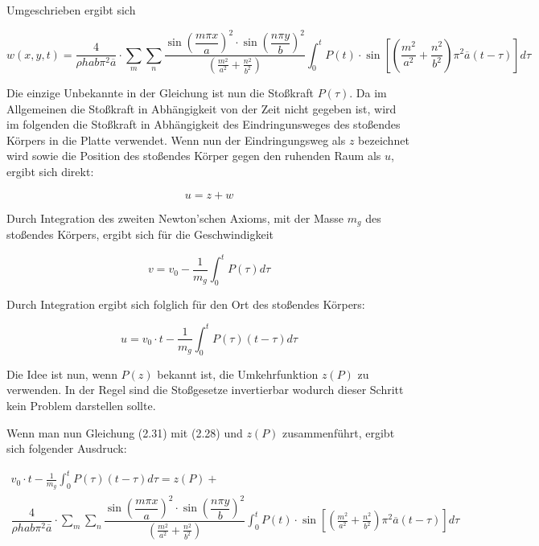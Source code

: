Umgeschrieben ergibt sich

\begin{equation}
	w(x,y,t) = \dfrac{4}{\rho h a b \pi^2 \overline{a}} \cdot \sum_m \sum_n 
	\dfrac{\sin\left(\dfrac{m \pi x}{a}\right)^2 \cdot \sin\left(\dfrac{n \pi y}{b}\right)^2}{\left(\frac{m^2}{a^2} + \frac{n^2}{b^2} \right)} 
	\int_0^t
	P(t)\cdot \sin \left[ \left(\frac{m^2}{a^2} + \frac{n^2}{b^2} \right) \pi^2 \overline{a} (t-\tau)\right] d\tau
\end{equation}


Die einzige Unbekannte in der Gleichung ist nun die Stoßkraft $P(\tau)$. Da im Allgemeinen die Stoßkraft in Abhängigkeit von der Zeit nicht gegeben ist, wird im folgenden die Stoßkraft in Abhängigkeit des Eindringunsweges des stoßendes Körpers in die Platte verwendet. Wenn nun der Eindringungsweg als $z$ bezeichnet wird sowie die Position des stoßendes Körper gegen den ruhenden Raum als $u$, ergibt sich direkt:

\begin{equation}
	u = z + w
\end{equation}


Durch Integration des zweiten Newton'schen Axioms, mit der Masse $m_g$ des stoßendes Körpers, ergibt sich für die Geschwindigkeit 

\begin{equation}
	v = v_0 - \frac{1}{m_g} \int_0^t P(\tau) d\tau
\end{equation}

Durch Integration ergibt sich folglich für den Ort des stoßendes Körpers:

\begin{equation}
	u = v_0 \cdot t - \frac{1}{m_g} \int_0^t P(\tau) (t-\tau) d\tau
\end{equation}


Die Idee ist nun, wenn $P(z)$ bekannt ist, die Umkehrfunktion $z(P)$ zu verwenden. In der Regel sind die Stoßgesetze invertierbar wodurch dieser Schritt kein Problem darstellen sollte.

Wenn man nun Gleichung (2.31) mit (2.28) und $z(P)$ zusammenführt, ergibt sich folgender Ausdruck:


\begin{multline}
v_0 \cdot t - \frac{1}{m_g} \int_0^t P(\tau) (t-\tau) d\tau = z(P) + \\ \dfrac{4}{\rho h a b \pi^2 \overline{a}} \cdot \sum_m \sum_n 
\dfrac{\sin\left(\dfrac{m \pi x}{a}\right)^2 \cdot \sin\left(\dfrac{n \pi y}{b}\right)^2}{\left(\frac{m^2}{a^2} + \frac{n^2}{b^2} \right)} 
\int_0^t
P(t)\cdot \sin \left[ \left(\frac{m^2}{a^2} + \frac{n^2}{b^2} \right) \pi^2 \overline{a} (t-\tau)\right] d\tau
\end{multline}

